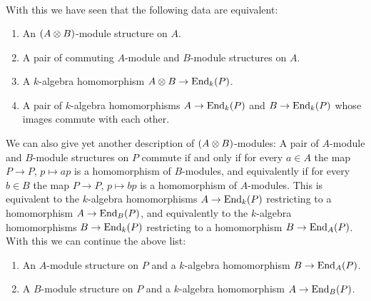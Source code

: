 \begin{fluff}
\begin{align*}
  \end{align*}
  With this we have seen that the following data are equivalent:
  \begin{enumerate}
    \item
      An $(A \mathbin{\otimes} B)$-module structure on $A$.
    \item
      A pair of commuting $A$-module and $B$-module structures on $A$.
    \item
      A $k$-algebra homomorphism $A \mathbin{\otimes} B \to \operatorname{End}_k(P)$.
    \item
      A pair of $k$-algebra homomorphisms $A \to \operatorname{End}_k(P)$ and $B \to \operatorname{End}_k(P)$ whose images commute with each other.
  \end{enumerate}
  
  We can also give yet another description of $(A \mathbin{\otimes} B)$-modules:
  A pair of $A$-module and $B$-module structures on $P$ commute if and only if for every $a \in A$ the map $P \to P$, $p \mapsto ap$ is a homomorphism of $B$-modules, and equivalently if for every $b \in B$ the map $P \to P$, $p \mapsto bp$ is a homomorphism of $A$-modules.
  This is equivalent to the $k$-algebra homomorphisms $A \to \operatorname{End}_k(P)$ restricting to a homomorphism $A \to \operatorname{End}_B(P)$, and equivalently to the $k$-algebra homomorphisms $B \to \operatorname{End}_k(P)$ restricting to a homomorphism $B \to \operatorname{End}_A(P)$.
  With this we can continue the above list:
  \begin{enumerate}[resume]
    \item
      An $A$-module structure on $P$ and a $k$-algebra homomorphism $B \to \operatorname{End}_A(P)$.
    \item
      A $B$-module structure on $P$ and a $k$-algebra homomorphism $A \to \operatorname{End}_B(P)$.
  \end{enumerate}
\end{fluff}


